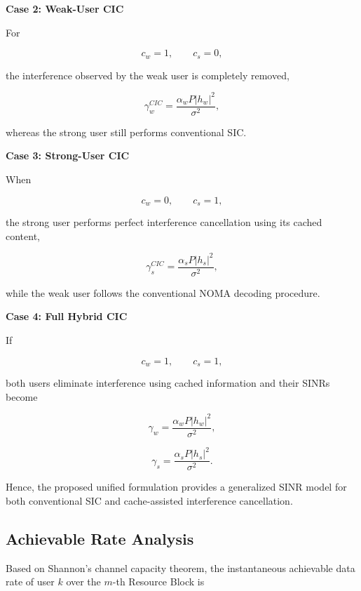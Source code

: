 \documentclass[conference]{IEEEtran}
\begin{document}
\textbf{Case 2: Weak-User CIC}

For

\[
c_w=1,\qquad c_s=0,
\]

the interference observed by the weak user is completely removed,

\begin{equation}
\gamma_w^{CIC}
=
\frac{\alpha_wP|h_w|^2}
{\sigma^2},
\end{equation}

whereas the strong user still performs conventional SIC.

\textbf{Case 3: Strong-User CIC}

When

\[
c_w=0,\qquad c_s=1,
\]

the strong user performs perfect interference cancellation using its cached content,

\begin{equation}
\gamma_s^{CIC}
=
\frac{\alpha_sP|h_s|^2}
{\sigma^2},
\end{equation}

while the weak user follows the conventional NOMA decoding procedure.

\textbf{Case 4: Full Hybrid CIC}

If

\[
c_w=1,\qquad c_s=1,
\]

both users eliminate interference using cached information and their SINRs become

\begin{equation}
\gamma_w
=
\frac{\alpha_wP|h_w|^2}
{\sigma^2},
\end{equation}

\begin{equation}
\gamma_s
=
\frac{\alpha_sP|h_s|^2}
{\sigma^2}.
\end{equation}

Hence, the proposed unified formulation provides a generalized SINR model for both conventional SIC and cache-assisted interference cancellation.

\subsection{Achievable Rate Analysis}

Based on Shannon's channel capacity theorem, the instantaneous achievable data rate of user $k$ over the $m$-th Resource Block is
\end{document}
